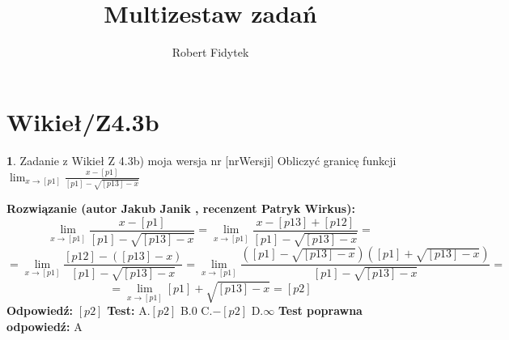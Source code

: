 \documentclass[12pt, a4paper]{article}
\title{Multizestaw zadań}
\author{Robert Fidytek}
\date{}
\theoremstyle{definition} %
\newtheorem{zad}{}
\newcommand{\kategoria}[1]{\section{#1}} %
\newcommand{\zadStart}[1]{\begin{zad}#1\newline} %
\newcommand{\zadStop}{\end{zad}}   %
\newcommand{\rozwStart}[2]{\noindent \textbf{Rozwiązanie (autor #1 , recenzent #2): }\newline} %
\newcommand{\rozwStop}{\newline}                                            %
\newcommand{\odpStart}{\noindent \textbf{Odpowiedź:}\newline}    %
\newcommand{\odpStop}{\newline}                                             %
\newcommand{\testStart}{\noindent \textbf{Test:}\newline} %
\newcommand{\testStop}{\newline} %
\newcommand{\kluczStart}{\noindent \textbf{Test poprawna odpowiedź:}\newline} %
\newcommand{\kluczStop}{\newline} %
\begin{document}
\maketitle


\kategoria{Wikieł/Z4.3b}
\zadStart{Zadanie z Wikieł Z 4.3b) moja wersja nr [nrWersji]}
Obliczyć granicę funkcji $\lim_{x \to [p1]} \frac{x-[p1]}{[p1]-\sqrt{[p13]-x}}$
\zadStop
\rozwStart{Jakub Janik}{Patryk Wirkus}
$$\lim_{x \to [p1]} \frac{x-[p1]}{[p1]-\sqrt{[p13]-x}}=\lim_{x \to [p1]} \frac{x-[p13]+[p12]}{[p1]-\sqrt{[p13]-x}}=$$
$$=\lim_{x \to [p1]} \frac{[p12]-([p13]-x)}{[p1]-\sqrt{[p13]-x}}=\lim_{x \to [p1]} \frac{([p1]-\sqrt{[p13]-x})([p1]+\sqrt{[p13]-x})}{[p1]-\sqrt{[p13]-x}}=$$
$$=\lim_{x \to [p1]} [p1]+\sqrt{[p13]-x}=[p2]$$
\rozwStop
\odpStart
$[p2]$
\odpStop
\testStart
A.$[p2]$
B.$0$
C.$-[p2]$
D.$\infty$
\testStop
\kluczStart
A
\kluczStop
\end{document}
